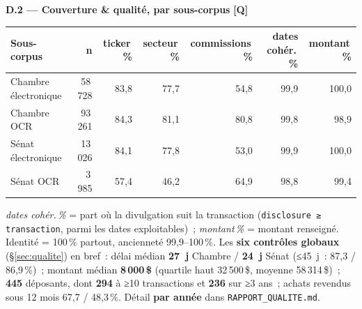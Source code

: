 \documentclass[11pt,a4paper]{article}
\newcommand{\co}[1]{\texttt{\small #1}}
\begin{document}
\textbf{D.2 — Couverture \& qualité, par sous-corpus} \hfill {\footnotesize\textbf{[Q]}}
\begin{center}\footnotesize
\begin{tabular}{l r rrr r r}
\toprule
\bfseries Sous-corpus & \bfseries n & \bfseries ticker\,\% & \bfseries secteur\,\% & \bfseries commissions\,\% & \bfseries dates cohér.\,\% & \bfseries montant\,\%\\
\midrule
{\color{houseC}Chambre électronique} & 58\,728 & 83,8 & 77,7 & 54,8 & 99,9 & 100,0 \\
{\color{houseC}Chambre OCR} & 93\,261 & 84,3 & 81,1 & 80,8 & 99,8 & 98,9 \\
{\color{senateC}Sénat électronique} & 13\,026 & 84,1 & 77,8 & 53,0 & 99,9 & 100,0 \\
{\color{senateC}Sénat OCR} & 3\,985 & 57,4 & 46,2 & 64,9 & 98,8 & 99,4 \\
\bottomrule
\end{tabular}
\end{center}
{\footnotesize \emph{dates cohér.\,\%} = part où la divulgation suit la transaction (\co{disclosure ≥
transaction}, parmi les dates exploitables)~; \emph{montant\,\%} = montant renseigné. Identité = 100\,\%
partout, ancienneté 99,9--100\,\%. Les \textbf{six contrôles globaux} (\S{}\ref{sec:qualite}) en bref~: délai
médian \textbf{27~j} Chambre / \textbf{24~j} Sénat (≤45~j~: 87,3 / 86,9\,\%)~; montant médian
\textbf{8\,000\,\$} (quartile haut 32\,500\,\$, moyenne 58\,314\,\$)~; \textbf{445} déposants, dont
\textbf{294} à ≥10 transactions et \textbf{236} sur ≥3 ans~; achats revendus sous 12 mois 67,7 / 48,3\,\%.
Détail \textbf{par année} dans \co{RAPPORT_QUALITE.md}.}
\end{document}

